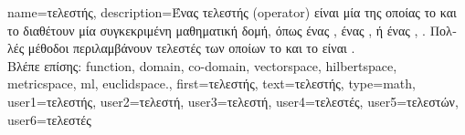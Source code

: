 {name={\foreignlanguage{greek}{τελεστής}}, 
	description={\foreignlanguage{greek}{Ένας τελεστής} (operator) \foreignlanguage{greek}{είναι 
		μία}  \foreignlanguage{greek}{της οποίας το}
		 \foreignlanguage{greek}{και το}  
		\foreignlanguage{greek}{διαθέτουν μία συγκεκριμένη μαθηματική δομή, όπως ένας}  
		, \foreignlanguage{greek}{ένας} ,
		\foreignlanguage{greek}{ή ένας}  \cite{DunfordSchwartz1988}, \cite{Bauschke:2017}. 
		\foreignlanguage{greek}{Πολλές μέθοδοι}  \foreignlanguage{greek}{περιλαμβάνουν 
		τελεστές των οποίων το}  \foreignlanguage{greek}{και το}  
		\foreignlanguage{greek}{είναι} .  
		\\ 
		\foreignlanguage{greek}{Βλέπε επίσης:} \gls{function}, \gls{domain}, \gls{co-domain}, \gls{vectorspace}, 
		\gls{hilbertspace}, \gls{metricspace}, \gls{ml}, \gls{euclidspace}.},
	first={\foreignlanguage{greek}{τελεστής}},
	text={\foreignlanguage{greek}{τελεστής}},
	type=math,
	user1={\foreignlanguage{greek}{τελεστής}}, %
	user2={\foreignlanguage{greek}{τελεστή}}, %
	user3={\foreignlanguage{greek}{τελεστή}}, %
	user4={\foreignlanguage{greek}{τελεστές}}, %
	user5={\foreignlanguage{greek}{τελεστών}}, %
	user6={\foreignlanguage{greek}{τελεστές}} %
}

